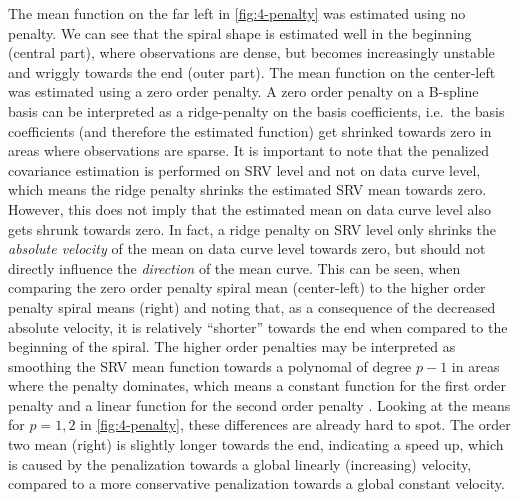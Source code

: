 The mean function on the far left in \cref{fig:4-penalty} was estimated using no penalty.
We can see that the spiral shape is estimated well in the beginning (central part), where observations are dense, but becomes increasingly unstable and wriggly towards the end (outer part).
The mean function on the center-left was estimated using a zero order penalty.
A zero order penalty on a B-spline basis can be interpreted as a ridge-penalty on the basis coefficients, i.e.\ the basis coefficients (and therefore the estimated function) get shrinked towards zero in areas where observations are sparse.
It is important to note that the penalized covariance estimation is performed on SRV level and not on data curve level, which means the ridge penalty shrinks the estimated SRV mean towards zero.
However, this does not imply that the estimated mean on data curve level also gets shrunk towards zero.
In fact, a ridge penalty on SRV level only shrinks the \emph{absolute velocity} of the mean on data curve level towards zero, but should not directly influence the \emph{direction} of the mean curve.
This can be seen, when comparing the zero order penalty spiral mean (center-left) to the higher order penalty spiral means (right) and noting that, as a consequence of the decreased absolute velocity, it is relatively \enquote{shorter} towards the end when compared to the beginning of the spiral.
The higher order penalties may be interpreted as smoothing the SRV mean function towards a polynomal of degree $p-1$ in areas where the penalty dominates, which means a constant function for the first order penalty and a linear function for the second order penalty \parencite[see e.g.][435]{FahrmeierEtAl2013}.
Looking at the means for $p = 1,2$ in \cref{fig:4-penalty}, these differences are already hard to spot.
The order two mean (right) is slightly longer towards the end, indicating a speed up, which is caused by the penalization towards a global linearly (increasing) velocity, compared to a more conservative penalization towards a global constant velocity. 


